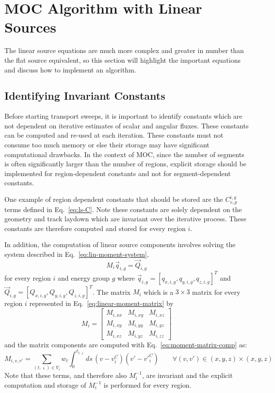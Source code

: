 \section{MOC Algorithm with Linear Sources}
\label{sec:ls-algorithm}

The linear source equations are much more complex and greater in number than the flat source equivalent, so this section will highlight the important equations and discuss how to implement an algorithm.

\subsection{Identifying Invariant Constants}

Before starting transport sweeps, it is important to identify constants which are not dependent on iterative estimates of scalar and angular fluxes. These constants can be computed and re-used at each iteration. These constants must not consume too much memory or else their storage may have significant computational drawbacks. In the context of \ac{MOC}, since the number of segments is often significantly larger than the number of regions, explicit storage should be implemented for region-dependent constants and not for segment-dependent constants.

One example of region dependent constants that should be stored are the $C_{v,p}^{i,g}$ terms defined in Eq.~\ref{eq:ls-C}. Note these constants are solely dependent on the geometry and track laydown which are invariant over the iterative process. These constants are therefore computed and stored for every region $i$.

In addition, the computation of linear source components involves solving the system described in Eq.~\ref{eq:lin-moment-system},
\begin{equation*}
M_i \vec{q}_{i,g} = \vec{Q}_{i,g}
\end{equation*}
for every region $i$ and energy group $g$ where $\vec{q}_{i,g} = \left[q_{x,i,g}, q_{y,i,g}, q_{z,i,g} \right]^T$ and $\vec{Q}_{i,g} = \left[Q_{x,i,g}, Q_{y,i,g}, Q_{z,i,g}\right]^T$. The matrix $M_i$ which is a $3 \times 3$ matrix for every region $i$ represented in Eq.~\ref{eq:linear-moment-matrix} by
\begin{equation*}
M_i = 
\begin{bmatrix}
M_{i,xx} & M_{i,xy}  & M_{i,xz} \\
M_{i,xy} & M_{i,yy}  & M_{i,yz} \\
M_{i,xz} & M_{i,yz}  & M_{i,zz}
\end{bmatrix}
\end{equation*}
and the matrix components are computed with Eq.~\ref{eq:moment-matrix-comp} as:
\begin{equation*}
M_{i,v,v'} = \sum_{(t,\varsigma) \in V_i} w_t  \int_{0}^{\ell_{t,\varsigma}} ds \, \left(v - v^C_i\right) \left( v' - {v'}^C_i \right) \qquad \forall (v,v') \in (x,y,z) \times (x,y,z)
\end{equation*}
Note that these terms, and therefore also $M_i^{-1}$, are invariant and the explicit computation and storage of $M_i^{-1}$ is performed for every region.

